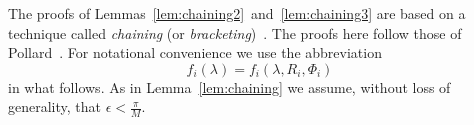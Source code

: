 \documentclass[journal]{IEEEtran}
\begin{document}
The proofs of Lemmas~\ref{lem:chaining2}~and~\ref{lem:chaining3} are based on a technique called \emph{chaining} (or \emph{bracketing})~\cite{Dudley_unif_central_lim_th_1999,Ossiander_clt_bracketing_1984,Pollard_asymp_empi_proc_1989,Pollard_new_ways_clts_1986}.  The proofs here follow those of Pollard~\cite[Section 3]{Pollard_asymp_empi_proc_1989}.  %
For notational convenience we use the abbreviation 
\[
f_{i}(\lambda) = f_{i}(\lambda, R_i, \Phi_i)
\]
in what follows.  As in Lemma~\ref{lem:chaining} we assume, without loss of generality, that $\epsilon < \tfrac{\pi}{M}$.  %
\end{document}
